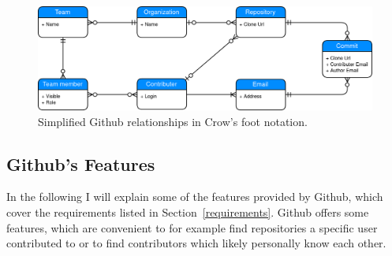 \begin{figure}[H]
\includegraphics[scale=0.27]{./graphs/github-data-structure}
\centering
\caption{Simplified Github relationships in Crow's foot notation.}\label{fig:github-relationship}
\end{figure}

\subsection{Github's Features}\label{github-features}
In the following I will explain some of the features provided by Github, which cover the requirements listed in Section~\ref{requirements}.
Github offers some features, which are convenient to for example find repositories a specific user contributed to or to find contributors which likely personally know each other.

